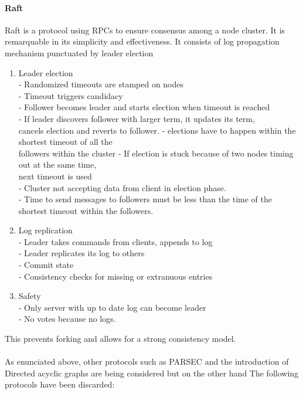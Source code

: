 \documentclass[]{article}
\begin{document}
\paragraph{Raft}
Raft is a protocol using RPCs to ensure consensus among a node cluster.
It is remarquable in its simplicity and effectiveness. 
It consists of log propagation mechanism punctuated by leader election\\
\begin{enumerate}
	\item Leader election\\
	- Randomized timeouts are stamped on nodes\\
	- Timeout triggers candidacy\\
	- Follower becomes leader and starts election when timeout is reached\\
	- If leader discovers follower with larger term, it updates its term,\\  cancels election and reverts to follower.
	- elections have to happen within the shortest timeout of all the\\ followers within the cluster
	- If election is stuck because of two nodes timing out at the same time,\\ 
	next timeout is used\\
	- Cluster not accepting data from client in election phase.\\
	- Time to send messages to followers must be less than the time
	of the shortest timeout within the followers. 
	\item Log replication\\
		- Leader takes commands from clients, appends to log\\
		- Leader replicates its log to others\\
		- Commit state\\
		- Consistency checks for missing or extranuous entries\\
	\item Safety\\
	- Only server with up to date log can become leader\\
	- No votes because no logs.\\
\end{enumerate}
This prevents forking and allows for a strong consistency model.
\paragraph{}

As enunciated above, other protocols such as PARSEC and 
the introduction of Directed acyclic graphs are being considered but 
on the other hand The following protocols have been discarded:
\end{document}

